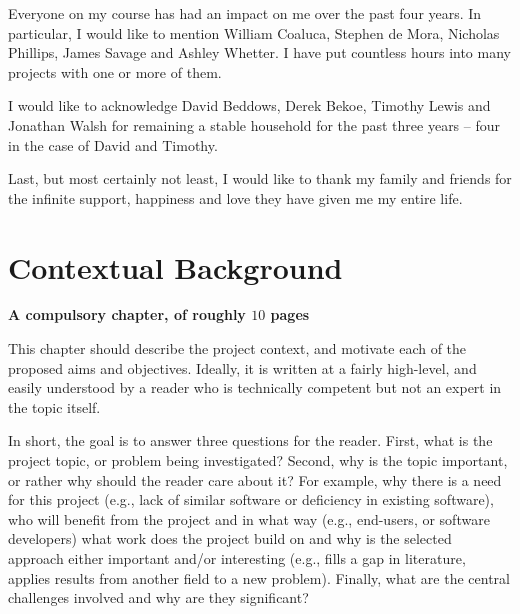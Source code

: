 \documentclass[ %
                    author={Dominic Joseph Moylett},
                    degree={MEng},
                     title={Dictionary Matching with Fingerprints},
                  subtitle={An Empirical Analysis},
                      type={research},
                      year={2015} ]{dissertation}
\begin{document}
Everyone on my course has had an impact on me over the past four years. In particular, I would like to mention William Coaluca, Stephen de Mora, Nicholas Phillips, James Savage and Ashley Whetter. I have put countless hours into many projects with one or more of them.

I would like to acknowledge David Beddows, Derek Bekoe, Timothy Lewis and Jonathan Walsh for remaining a stable household for the past three years -- four in the case of David and Timothy.

Last, but most certainly not least, I would like to thank my family and friends for the infinite support, happiness and love they have given me my entire life.


%

\mainmatter


\chapter{Contextual Background}
\label{chap:context}

{\bf A compulsory chapter, of roughly $10$ pages}
\vspace{1cm} 

\noindent
This chapter should describe the project context, and motivate each of
the proposed aims and objectives.  Ideally, it is written at a fairly 
high-level, and easily understood by a reader who is technically 
competent but not an expert in the topic itself.

In short, the goal is to answer three questions for the reader.  First, 
what is the project topic, or problem being investigated?  Second, why 
is the topic important, or rather why should the reader care about it?  
For example, why there is a need for this project (e.g., lack of similar 
software or deficiency in existing software), who will benefit from the 
project and in what way (e.g., end-users, or software developers) what 
work does the project build on and why is the selected approach either
important and/or interesting (e.g., fills a gap in literature, applies
results from another field to a new problem).  Finally, what are the 
central challenges involved and why are they significant? 
 
\end{document}
